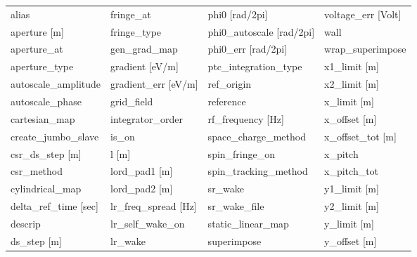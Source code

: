  \begin{tabular}{llll} \toprule
alias                            & fringe_at                        & phi0 [rad/2pi]                   & voltage_err [Volt]               \\
aperture [m]                     & fringe_type                      & phi0_autoscale [rad/2pi]         & wall                             \\
aperture_at                      & gen_grad_map                     & phi0_err [rad/2pi]               & wrap_superimpose                 \\
aperture_type                    & gradient [eV/m]                  & ptc_integration_type             & x1_limit [m]                     \\
autoscale_amplitude              & gradient_err [eV/m]              & ref_origin                       & x2_limit [m]                     \\
autoscale_phase                  & grid_field                       & reference                        & x_limit [m]                      \\
cartesian_map                    & integrator_order                 & rf_frequency [Hz]                & x_offset [m]                     \\
create_jumbo_slave               & is_on                            & space_charge_method              & x_offset_tot [m]                 \\
csr_ds_step [m]                  & l [m]                            & spin_fringe_on                   & x_pitch                          \\
csr_method                       & lord_pad1 [m]                    & spin_tracking_method             & x_pitch_tot                      \\
cylindrical_map                  & lord_pad2 [m]                    & sr_wake                          & y1_limit [m]                     \\
delta_ref_time [sec]             & lr_freq_spread [Hz]              & sr_wake_file                     & y2_limit [m]                     \\
descrip                          & lr_self_wake_on                  & static_linear_map                & y_limit [m]                      \\
ds_step [m]                      & lr_wake                          & superimpose                      & y_offset [m]                     \\

\end{tabular}
